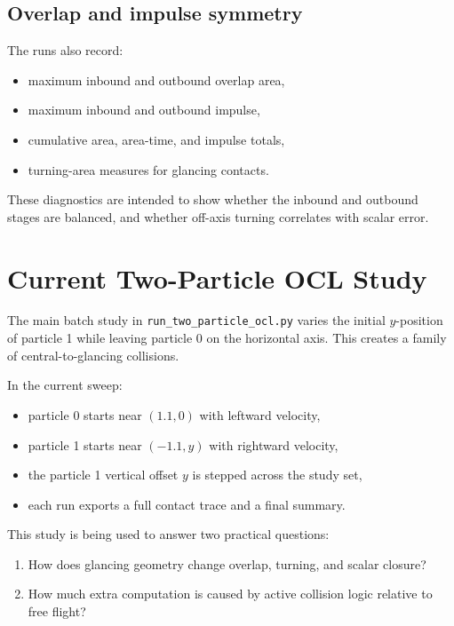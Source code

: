 \documentclass[11pt]{article}
\begin{document}
\subsection{Overlap and impulse symmetry}
The runs also record:
\begin{itemize}[leftmargin=1.5em]
    \item maximum inbound and outbound overlap area,
    \item maximum inbound and outbound impulse,
    \item cumulative area, area-time, and impulse totals,
    \item turning-area measures for glancing contacts.
\end{itemize}
These diagnostics are intended to show whether the inbound and outbound stages are balanced, and whether off-axis turning correlates with scalar error.

\section{Current Two-Particle OCL Study}
The main batch study in \texttt{run\_two\_particle\_ocl.py} varies the initial $y$-position of particle 1 while leaving particle 0 on the horizontal axis. This creates a family of central-to-glancing collisions.

In the current sweep:
\begin{itemize}[leftmargin=1.5em]
    \item particle 0 starts near $(1.1, 0)$ with leftward velocity,
    \item particle 1 starts near $(-1.1, y)$ with rightward velocity,
    \item the particle 1 vertical offset $y$ is stepped across the study set,
    \item each run exports a full contact trace and a final summary.
\end{itemize}

This study is being used to answer two practical questions:
\begin{enumerate}[leftmargin=1.5em]
    \item How does glancing geometry change overlap, turning, and scalar closure?
    \item How much extra computation is caused by active collision logic relative to free flight?
\end{enumerate}
\end{document}
